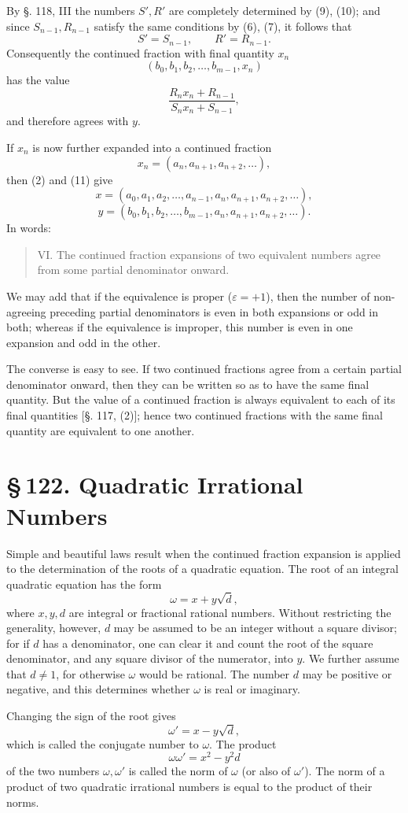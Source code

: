 \documentclass[11pt]{article}
\providecommand{\sect}[2]{\section*{\S\,#1. #2}}
\begin{document}
By §. 118, III the numbers $S',R'$ are completely determined by (9), (10); and since $S_{n-1},R_{n-1}$ satisfy the same conditions by (6), (7), it follows that
\[
        S'=S_{n-1},
        \qquad
        R'=R_{n-1}.
\]
Consequently the continued fraction with final quantity $x_n$
\[
\tag{11}       (b_0,b_1,b_2,\ldots,b_{m-1},x_n)
\]
has the value
\[
        \frac{R_nx_n+R_{n-1}}{S_nx_n+S_{n-1}},
\]
and therefore agrees with $y$.

If $x_n$ is now further expanded into a continued fraction
\[
        x_n=(a_n,a_{n+1},a_{n+2},\ldots),
\]
then (2) and (11) give
\[
        x=(a_0,a_1,a_2,\ldots,a_{n-1},a_n,a_{n+1},a_{n+2},\ldots),
\]
\[
        y=(b_0,b_1,b_2,\ldots,b_{m-1},a_n,a_{n+1},a_{n+2},\ldots).
\]
In words:
\begin{quote}
VI. The continued fraction expansions of two equivalent numbers agree from some partial denominator onward.
\end{quote}
We may add that if the equivalence is proper ($\varepsilon=+1$), then the number of non-agreeing preceding partial denominators is even in both expansions or odd in both; whereas if the equivalence is improper, this number is even in one expansion and odd in the other.

The converse is easy to see. If two continued fractions agree from a certain partial denominator onward, then they can be written so as to have the same final quantity. But the value of a continued fraction is always equivalent to each of its final quantities [§. 117, (2)]; hence two continued fractions with the same final quantity are equivalent to one another.

\sect{122}{Quadratic Irrational Numbers}

Simple and beautiful laws result when the continued fraction expansion is applied to the determination of the roots of a quadratic equation. The root of an integral quadratic equation has the form
\[
\tag{1}        \omega=x+y\sqrt d,
\]
where $x,y,d$ are integral or fractional rational numbers. Without restricting the generality, however, $d$ may be assumed to be an integer without a square divisor; for if $d$ has a denominator, one can clear it and count the root of the square denominator, and any square divisor of the numerator, into $y$. We further assume that $d\ne1$, for otherwise $\omega$ would be rational. The number $d$ may be positive or negative, and this determines whether $\omega$ is real or imaginary.

Changing the sign of the root gives
\[
\tag{2}        \omega'=x-y\sqrt d,
\]
which is called the conjugate number to $\omega$. The product
\[
        \omega\omega'=x^2-y^2d
\]
of the two numbers $\omega,\omega'$ is called the norm of $\omega$ (or also of $\omega'$). The norm of a product of two quadratic irrational numbers is equal to the product of their norms.
\end{document}
